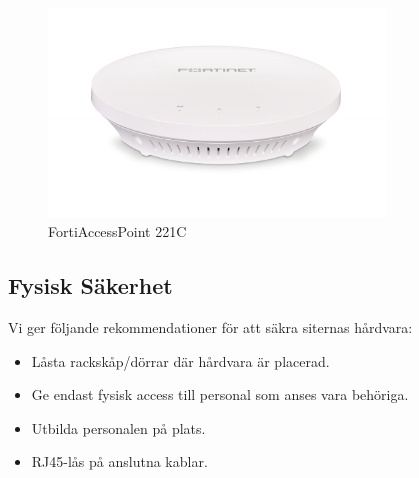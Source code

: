     \begin{figure}[htb]
        \centering
        \includegraphics[width=0.8\textwidth,trim={0 3cm 0 1cm}, clip]{pics/FortiAccesspoint-221C.pdf}
        \caption{FortiAccessPoint 221C}
        \label{fig:ap-221c}
    \end{figure}

\subsection{Fysisk Säkerhet}
Vi ger följande rekommendationer för att säkra siternas hårdvara:
    \begin{itemize}[noitemsep]
        \item Låsta rackskåp/dörrar där hårdvara är placerad.
        \item Ge endast fysisk access till personal som anses vara behöriga.
        \item Utbilda personalen på plats.
        \item RJ45-lås på anslutna kablar.
    \end{itemize}




